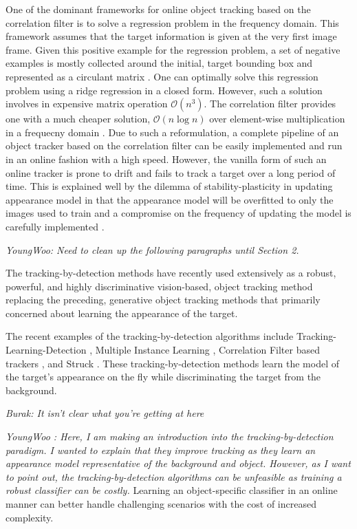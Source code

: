 \documentclass[10pt,twocolumn,letterpaper]{article}
\newcounter{ct}
\begin{document}
One of the dominant frameworks for online object tracking based on the
correlation filter is to solve a regression problem in the frequency
domain. This framework assumes that the target information is given at
the very first image frame. Given this positive example for the
regression problem, a set of negative examples is mostly collected
around the initial, target bounding box and represented as a circulant
matrix \cite{henriques2015high}. One can optimally solve this
regression problem using a ridge regression in a closed form. However,
such a solution involves in expensive matrix operation
$\mathcal{O}(n^{3})$. The correlation filter provides one with a much
cheaper solution, $\mathcal{O}(n\log n)$ over element-wise
multiplication in a frequecny domain
\cite{bolme2010visual,henriques2015high}. Due to such a reformulation,
a complete pipeline of an object tracker based on the correlation
filter can be easily implemented and run in an online fashion with a
high speed. However, the vanilla form of such an online tracker is
prone to drift and fails to track a target over a long period of
time. This is explained well by the dilemma of stability-plasticity in
updating appearance model in that the appearance model will be
overfitted to only the images used to train and a compromise on the
frequency of updating the model is carefully implemented
\cite{santner2010prost}.

{\it YoungWoo: Need to clean up the following paragraphs until Section
  2.}

The tracking-by-detection methods have recently used extensively as a
robust, powerful, and highly discriminative vision-based, object
tracking method replacing the preceding, generative object tracking
methods that primarily concerned about learning the appearance of the
target. 

The recent examples of the tracking-by-detection algorithms include
Tracking-Learning-Detection \cite{kalal2012tracking}, Multiple
Instance Learning \cite{babenko2009visual}, Correlation Filter based
trackers \cite{bolme2010visual,henriques2015high}, and Struck
\cite{hare2012efficient}. These tracking-by-detection methods learn
the model of the target's appearance on the fly while discriminating
the target from the background.

{\it Burak: It isn't clear what you're getting at here} 

{\it YoungWoo : Here, I am making an introduction
into the tracking-by-detection paradigm. I wanted to explain that they improve tracking as they learn an appearance model representative of the background and object. However, as I want to point out, the tracking-by-detection algorithms can be unfeasible as training a robust classifier can be costly. } Learning
an object-specific classifier in an online manner can better handle
challenging scenarios with the cost of increased complexity.
\end{document}
